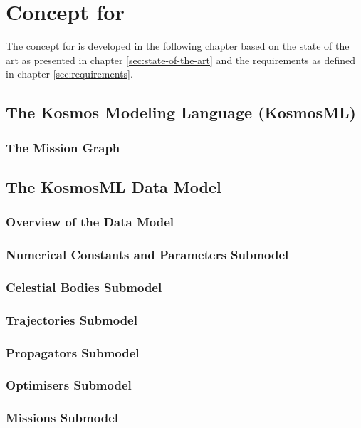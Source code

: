 \chapter{Concept for \topic}
\label{sec:concept}

The concept for \topic is developed in the following chapter based on the state of the art as presented in chapter \ref{sec:state-of-the-art} and the requirements as defined in chapter \ref{sec:requirements}.

\section{The Kosmos Modeling Language (KosmosML)}
\label{sec:kosmosml}

\subsection{The Mission Graph}
\label{sec:mission-graph}

\section{The KosmosML Data Model}
\label{sec:kosmosml-data-model}

\subsection{Overview of the Data Model}
\label{sec:overview-data-model}



\subsection{Numerical Constants and Parameters Submodel}
\label{sec:numbers-submodel}



\subsection{Celestial Bodies Submodel}
\label{sec:celestial-bodies-submodel}



\subsection{Trajectories Submodel}
\label{sec:trajectories-submodel}



\subsection{Propagators Submodel}
\label{sec:propagators-submodel}



\subsection{Optimisers Submodel}
\label{sec:optimisers-submodel}



\subsection{Missions Submodel}
\label{sec:missions-submodel}


